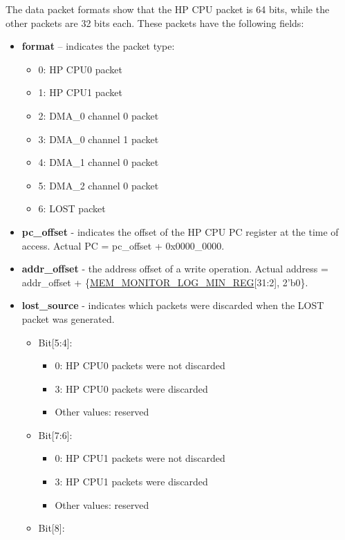 \documentclass[main\_\_EN.tex]{subfiles}
\begin{document}
The data packet formats show that the HP CPU packet is 64 bits, while the other packets are 32 bits each. These packets have the following fields:

\begin{itemize}
    \item \textbf{format} – indicates the packet type:
    \begin{itemize}
        \item 0: HP CPU0 packet
        \item 1: HP CPU1 packet
        \item 2: DMA\_0 channel 0 packet
        \item 3: DMA\_0 channel 1 packet
        \item 4: DMA\_1 channel 0 packet
        \item 5: DMA\_2 channel 0 packet
        \item 6: LOST packet
    \end{itemize}
    \item \textbf{pc\_offset} - indicates the offset of the HP CPU PC register at the time of access. Actual PC = pc\_offset + 0x0000\_0000. 
    \item \textbf{addr\_offset} - the address offset of a write operation. Actual address = addr\_offset + \{\hyperref[regdesc:MEMMONITORLOGMINREG]{MEM\_MONITOR\_LOG\_MIN\_REG}[31:2], 2'b0\}.
    \item \textbf{lost\_source} - indicates which packets were discarded when the LOST packet was generated.
    \begin{itemize}
        \item Bit[5:4]:
        \begin{itemize}
            \item 0: HP CPU0 packets were not discarded
            \item 3: HP CPU0 packets were discarded
            \item Other values: reserved
        \end{itemize}
        \item Bit[7:6]:
        \begin{itemize}
            \item 0: HP CPU1 packets were not discarded
            \item 3: HP CPU1 packets were discarded
            \item Other values: reserved
        \end{itemize}
        \item Bit[8]:

\end{itemize}
\end{itemize}
\end{document}
